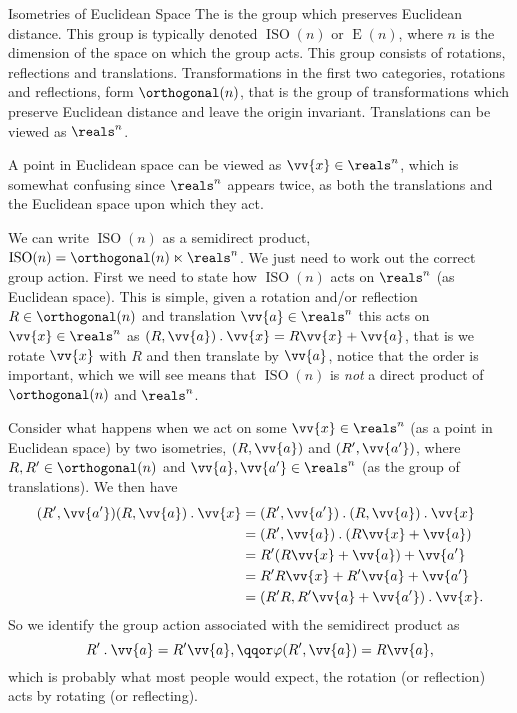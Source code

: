 \documentclass[fleqn]{NotesClass}
\newcommand*{\action}{\mathbin{.}}
\DeclareMathOperator{\ISO}{ISO}
\begin{document}
    \begin{exm}{Isometries of Euclidean Space}{}
        The  is the group which preserves Euclidean distance.
        This group is typically denoted \(\ISO(n)\) or \(\mathop{\mathrm{E}}(n)\), where \(n\) is the dimension of the space on which the group acts.
        This group consists of rotations, reflections and translations.
        Transformations in the first two categories, rotations and reflections, form \(\orthogonal(n)\), that is the group of transformations which preserve Euclidean distance and leave the origin invariant.
        Translations can be viewed as \(\reals^n\).
        
        A point in Euclidean space can be viewed as \(\vv{x} \in \reals^n\), which is somewhat confusing since \(\reals^n\) appears twice, as both the translations and the Euclidean space upon which they act.
        
        We can write \(\ISO(n)\) as a semidirect product, \(\ISO(n) = \orthogonal(n) \ltimes \reals^n\).
        We just need to work out the correct group action.
        First we need to state how \(\ISO(n)\) acts on \(\reals^n\) (as Euclidean space).
        This is simple, given a rotation and/or reflection \(R \in \orthogonal(n)\) and translation \(\vv{a} \in \reals^n\) this acts on \(\vv{x} \in \reals^n\) as \((R, \vv{a}) \action \vv{x} = R\vv{x} + \vv{a}\), that is we rotate \(\vv{x}\) with \(R\) and then translate by \(\vv{a}\), notice that the order is important, which we will see means that \(\ISO(n)\) is \emph{not} a direct product of \(\orthogonal(n)\) and \(\reals^n\).
        
        Consider what happens when we act on some \(\vv{x} \in \reals^n\) (as a point in Euclidean space) by two isometries, \((R, \vv{a})\) and \((R', \vv{a'})\), where \(R, R' \in \orthogonal(n)\) and \(\vv{a}, \vv{a'} \in \reals^n\) (as the group of translations).
        We then have
        \begin{align}
            (R', \vv{a'})(R, \vv{a}) \action \vv{x} &= (R', \vv{a'}) \action (R, \vv{a}) \action \vv{x}\\
            &= (R', \vv{a}) \action (R\vv{x} + \vv{a})\\
            &= R'(R\vv{x} + \vv{a}) + \vv{a'}\\
            &= R'R\vv{x} + R'\vv{a} + \vv{a'}\\
            &= (R'R, R'\vv{a} + \vv{a'})\action \vv{x}.
        \end{align}
        So we identify the group action associated with the semidirect product as
        \begin{equation}
            R'\action \vv{a} = R'\vv{a}, \qqor \varphi(R', \vv{a}) = R\vv{a},
        \end{equation}
        which is probably what most people would expect, the rotation (or reflection) acts by rotating (or reflecting).
    \end{exm}
    
\end{document}
